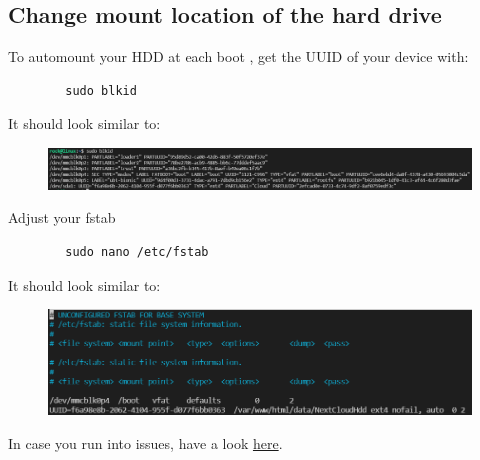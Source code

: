 \documentclass[a4paper,12pt]{article}
\begin{document}
	\subsection{Change mount location of the hard drive}
	To automount your HDD at each boot , get the UUID of your device with:
	\begin{verbatim}
		sudo blkid
	\end{verbatim}
	It should look similar to:
	\begin{figure}
		\includegraphics{images/BlkId.png}
	\end{figure}
	Adjust your fstab
	\begin{verbatim}
		sudo nano /etc/fstab
	\end{verbatim}
	It should look similar to:
	\begin{figure}
		\includegraphics{images/fstab.png}
	\end{figure}
	In case you run into issues, have a look \href{https://www.linuxbabe.com/desktop-linux/how-to-automount-file-systems-on-linux}{here}.
\end{document}
